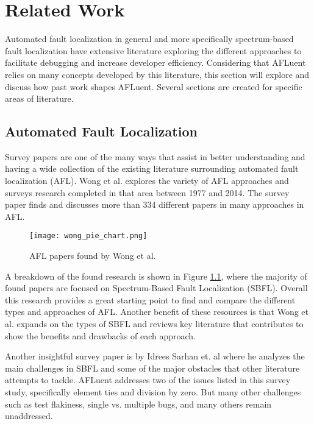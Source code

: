 \chapter{Related Work}
\label{ch:relatedwork}

Automated fault localization in general and more specifically spectrum-based
fault localization have extensive literature exploring the different approaches
to facilitate debugging and increase developer efficiency. Considering that
AFLuent relies on many concepts developed by this literature, this section will
explore and discuss how past work shapes AFLuent. Several sections are created
for specific areas of literature.

\section{Automated Fault Localization}
\label{sec:AFLlit}

Survey papers are one of the many ways that assist in better
understanding and having a wide collection of the existing
literature surrounding automated fault localization (AFL).
Wong et al. \cite{wong2016survey} explores the variety of AFL approaches and
surveys research completed in that area between 1977 and 2014. The survey paper finds and
discusses more than 334 different papers in many approaches in AFL.

\begin{figure}[!htb]
	\begin{center}
		\texttt{[image: wong\_pie\_chart.png]}
		\caption{\label{fig:wong_breakdown} AFL papers found by Wong et al. \cite{wong2016survey}}
	\end{center}
\end{figure}

A breakdown of the found research is shown in Figure \ref{fig:wong_breakdown}, where the
majority of found papers are focused on Spectrum-Based Fault Localization (SBFL).
Overall this research provides a great
starting point to find and compare the different types and approaches of AFL.
Another benefit of these resources is that
Wong et al. \cite{wong2016survey} expands on the types of SBFL
and reviews key literature that contributes to show the benefits and drawbacks of
each approach.

Another insightful survey paper is by Idrees Sarhan et. al \cite{sarhan2022Challenges}
where he analyzes the main challenges in SBFL and some of
the major obstacles that other literature attempts to tackle. AFLuent addresses
two of the issues listed in this survey study, specifically element ties and
division by zero. But many other challenges such as test flakiness, single vs.
multiple bugs, and many others remain unaddressed.

